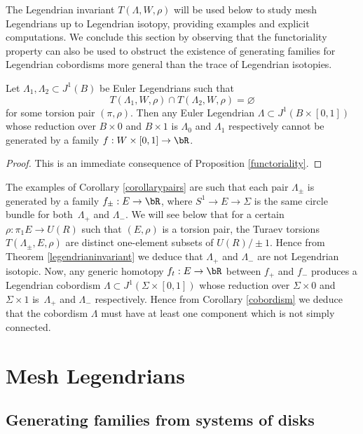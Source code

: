 The Legendrian invariant $T(\Lambda, W, \rho)$ will be used below to study mesh Legendrians up to Legendrian isotopy, providing examples and explicit computations. We conclude this section by observing that the functoriality property can also be used to obstruct the existence of generating families for Legendrian cobordisms more general than the trace of Legendrian isotopies.

\begin{corollary}\label{cobordism}
Let $\Lambda_1, \Lambda_2 \subset J^1(B)$ be Euler Legendrians such that
\[
T(\Lambda_1,W,\rho) \cap T(\Lambda_2, W, \rho) = \varnothing
\]
for some torsion pair $(\pi, \rho)$. Then any Euler Legendrian $\Lambda \subset J^1(B \times [0,1])$ whose reduction over $B \times 0$ and $B \times 1$ is $\Lambda_0$ and $\Lambda_1$ respectively cannot be generated by a family $f:W \times [0,1]\to \bR$.
\end{corollary}

\begin{proof} This is an immediate consequence of Proposition \ref{functoriality}. \end{proof}

\begin{example}
The examples of Corollary \ref{corollarypairs} are such that each pair $\Lambda_\pm$ is generated by a family $f_\pm : E \to \bR$, where $S^1 \to E \to \Sigma$ is the same circle bundle for both~$\Lambda_+$ and $\Lambda_-$. We will see below that for a certain $\rho: \pi_1E \to U(R)$ such that $(E,\rho)$ is a torsion pair, the Turaev torsions $T(\Lambda_\pm, E, \rho)$ are distinct one-element subsets of $U(R) / \pm 1$. Hence from Theorem \ref{legendrianinvariant} we deduce that $\Lambda_+$ and $\Lambda_-$ are not Legendrian isotopic. Now, any generic homotopy $f_t:E \to \bR$ between $f_+$ and $f_-$ produces a Legendrian cobordism $\Lambda \subset J^1(\Sigma \times [0,1])$ whose reduction over $\Sigma \times 0$ and $\Sigma \times 1$ is~$\Lambda_+$ and $\Lambda_-$ respectively. Hence from Corollary \ref{cobordism} we deduce that the cobordism $\Lambda$ must have at least one component which is not simply connected.
\end{example}

\section{Mesh Legendrians}\label{Section: mesh Legendrians}

\subsection{Generating families from systems of disks}\label{systems of disks}

